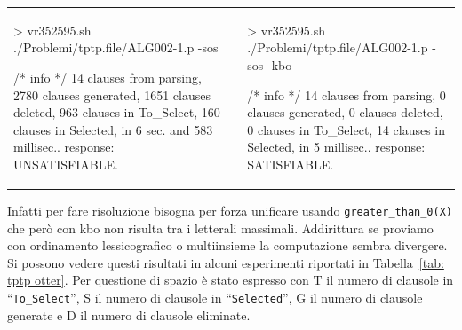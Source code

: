 \documentclass[a4paper,11pt]{article} %
\newcommand{\file}{\texttt}
\newcommand{\campo}{\texttt}
\newcommand{\cod}{\lstset{basicstyle=\ttfamily}\lstinline}
\begin{document}
\begin{tabular}{p{}p{}p{}}
\footnotesize
\begin{shell}
> vr352595.sh 
  ./Problemi/tptp.file/ALG002-1.p 
  -sos

/* info */
14 clauses from parsing, 
2780 clauses generated, 
1651 clauses deleted, 
963 clauses in To_Select, 
160 clauses in Selected, 
in 6 sec. and 583 millisec..
response: UNSATISFIABLE.
\end{shell}
& &
\footnotesize
\begin{shell}
> vr352595.sh 
  ./Problemi/tptp.file/ALG002-1.p 
  -sos -kbo

/* info */
14 clauses from parsing, 
0 clauses generated, 
0 clauses deleted, 
0 clauses in To_Select, 
14 clauses in Selected, 
in 5 millisec..
response: SATISFIABLE.
\end{shell}
 \\
\end{tabular}
%
%
%
%
%
%
%
%
%

Infatti per fare risoluzione bisogna per forza %
unificare %
usando
\cod{greater_than_0(X)} %
che però con kbo non risulta tra i letterali massimali.
Addirittura se proviamo con ordinamento lessicografico o multiinsieme 
la computazione sembra divergere.
Si possono vedere questi risultati in alcuni esperimenti riportati
in Tabella~\ref{tab: tptp otter}. Per questione di spazio
è stato espresso con \textsf{T} il numero di clausole in 
``\campo{To\_Select}'',
\textsf{S} il numero di clausole in ``\campo{Selected}'',
\textsf{G} il numero di clausole generate e
\textsf{D} il numero di clausole eliminate.
\end{document}
